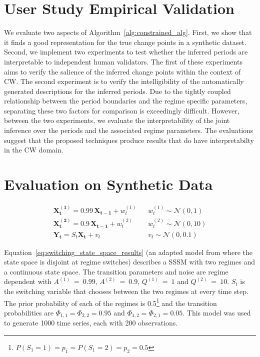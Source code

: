 \section{User Study Empirical Validation}
We evaluate two aspects of Algorithm~\ref{alg:constrained_alg}. First, we show that it finds a good representation for the true change points in a synthetic dataset. Second, we implement two experiments to test whether the inferred periods are interpretable to independent human validators. The first of these experiments aims to verify the salience of the inferred change points within the context of CW. The second experiment is to verify the intelligibility of the automatically generated descriptions for the inferred periods. Due to the tightly coupled relationship between the period boundaries and the regime specific parameters, separating these two factors for comparison is exceedingly difficult. However, between the two experiments, we evaluate the interpretability of the joint inference over the periods and the associated regime parameters. The evaluations suggest that the proposed techniques produce results that do have interpretabilty in the CW domain.

\section{Evaluation on Synthetic Data}

\begin{equation}
  \begin{split}
      \mathbf{X^{(1)}_t} = 0.99 \,\mathbf{X_{t-1}} + w^{(1)}_t \hspace{10pt} & w^{(1)}_t \sim \mathcal{N}(0,1) \\
      \mathbf{X^{(2)}_t} = 0.9 \,\mathbf{X_{t-1}} + w^{(2)}_t \hspace{10pt} & w^{(2)}_t \sim \mathcal{N}(0,10) \\
      \mathbf{Y_t} = S_t\mathbf{X_t} + v_t \hspace{10pt} & v_t \sim \mathcal{N}(0,0.1)
  \end{split}\label{eq:switching_state_space_results}
\end{equation}

Equation~\ref{eq:switching_state_space_results} (an adapted model from \citet{ghahramani2000variational} where the state space is disjoint at regime switches) describes a SSSM with two regimes and a continuous state space. The transition parameters and noise are regime dependent with $A^{(1)}~=~0.99$, $A^{(2)}~=~0.9$, $Q^{(1)}~=~1$ and $Q^{(2)}~=~10$. $S_t$ is the switching variable that chooses between the two regimes at every time step. The prior probability of each of the regimes is 0.5\footnote{$P(S_1=1)=p_1=P(S_1=2)=p_2=0.5$} and the transition probabilities are $\Phi_{1,1} = \Phi_{2,2} = 0.95$ and $\Phi_{1,2} = \Phi_{2,1} = 0.05$. This model was used to generate 1000 time series, each with 200 observations.

